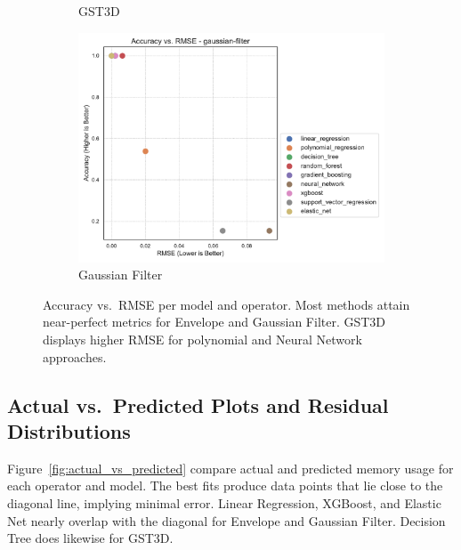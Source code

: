 \begin{figure}[htbp]
\begin{subfigure}[t]{0.32\textwidth}
        \caption{\ac{GST3D}}
    \end{subfigure}
    \hfill
    \begin{subfigure}[t]{0.32\textwidth}
        \includegraphics[width=\textwidth]{assets/images/05/accuracy_by_rmse_per_model_gaussian-filter}
        \caption{Gaussian Filter}
    \end{subfigure}
    \caption{Accuracy vs.\ \ac{RMSE} per model and operator.
    Most methods attain near-perfect metrics for Envelope and Gaussian Filter.
    \ac{GST3D} displays higher \ac{RMSE} for polynomial and Neural Network approaches.}
    \label{fig:accuracy_rmse_envelope}
\end{figure}

\subsection{Actual vs.\ Predicted Plots and Residual Distributions}
\label{subsec:actual-vs-predicted-and-residual-distributions}

Figure~\ref{fig:actual_vs_predicted} compare actual and predicted memory usage for each operator and model.
The best fits produce data points that lie close to the diagonal line, implying minimal error.
Linear Regression, XGBoost, and Elastic Net nearly overlap with the diagonal for Envelope and Gaussian Filter.
Decision Tree does likewise for \ac{GST3D}.

